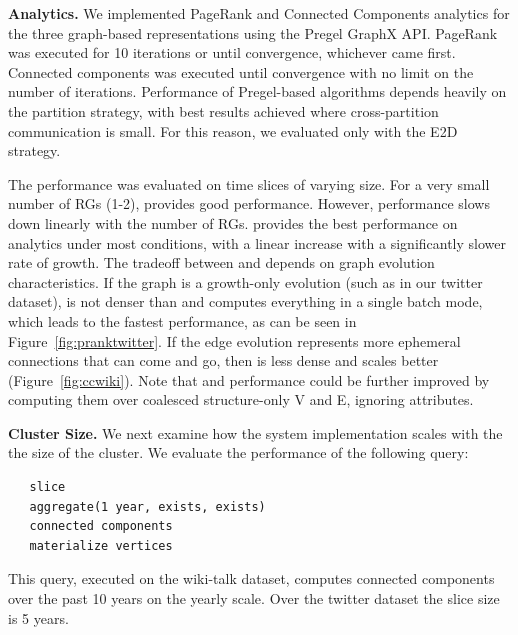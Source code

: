 {\bf Analytics.}  We implemented PageRank and Connected Components
analytics for the three graph-based representations using the Pregel
GraphX API.  PageRank was executed for 10 iterations or until
convergence, whichever came first.  Connected components was executed
until convergence with no limit on the number of iterations.
Performance of Pregel-based algorithms depends heavily on the
partition strategy, with best results achieved where cross-partition
communication is small.  For this reason, we evaluated only with the
E2D strategy.  

The performance was evaluated on time slices of varying size.  For a
very small number of RGs (1-2), \sg provides good performance.
However, \sg performance slows down linearly with the number of RGs.
\hg provides the best performance on analytics under most conditions,
with a linear increase with a significantly slower rate of growth.
The tradeoff between \og and \hg depends on graph evolution
characteristics.  If the graph is a growth-only evolution (such as in
our twitter dataset), \og is not denser than \hg and computes
everything in a single batch mode, which leads to the fastest
performance, as can be seen in Figure~\ref{fig:pranktwitter}.  If the
edge evolution represents more ephemeral connections that can come and
go, then \hg is less dense and scales better
(Figure~\ref{fig:ccwiki}).  Note that \og and \hg performance could be
further improved by computing them over coalesced structure-only V and
E, ignoring attributes.

{\bf Cluster Size.}  We next examine how the system implementation
scales with the the size of the cluster.  We evaluate the performance
of the following query:

\begin{small}
\begin{verbatim}
   slice
   aggregate(1 year, exists, exists)
   connected components
   materialize vertices
\end{verbatim}
\end{small}

This query, executed on the wiki-talk dataset, computes connected
components over the past 10 years on the yearly scale.  Over the
twitter dataset the slice size is 5 years.


